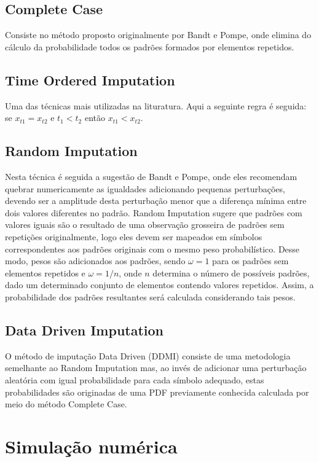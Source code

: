 \documentclass[paper=a4, fontsize=11pt]{scrartcl}
\numberwithin{equation}{section}
\numberwithin{figure}{section}
\numberwithin{table}{section}
\begin{document}
\subsection{Complete Case}

Consiste no método proposto originalmente por Bandt e Pompe, onde elimina do cálculo da probabilidade todos os padrões formados por elementos repetidos. 

\subsection{Time Ordered Imputation} 

Uma das técnicas mais utilizadas na lituratura. Aqui a seguinte regra é seguida: se $x_{t1} = x_{t2}$ e $t_{1} < t_{2}$ então $x_{t1} < x_{t2}$.

\subsection{Random Imputation}

Nesta técnica é seguida a sugestão de Bandt e Pompe, onde eles recomendam quebrar numericamente as igualdades adicionando pequenas perturbações, devendo ser a amplitude desta perturbação menor que a diferença mínima entre dois valores diferentes no padrão. Random Imputation sugere que padrões com valores iguais são o resultado de uma observação grosseira de padrões sem repetições originalmente, logo eles devem ser mapeados em símbolos correspondentes aos padrões originais com o mesmo peso probabilístico. Desse modo, pesos são adicionados aos padrões, sendo $\omega = 1$ para os padrões sem elementos repetidos e $\omega = 1/n$, onde $n$ determina o número de possíveis padrões, dado um determinado conjunto de elementos contendo valores repetidos. Assim, a probabilidade dos padrões resultantes será calculada considerando tais pesos.

\subsection{Data Driven Imputation}

O método de imputação Data Driven (DDMI) consiste de uma metodologia semelhante ao Random Imputation mas, ao invés de adicionar uma perturbação aleatória com igual probabilidade para cada símbolo adequado, estas probabilidades são originadas de uma PDF previamente conhecida calculada por meio do método Complete Case.

\section{Simulação numérica}
\end{document}
